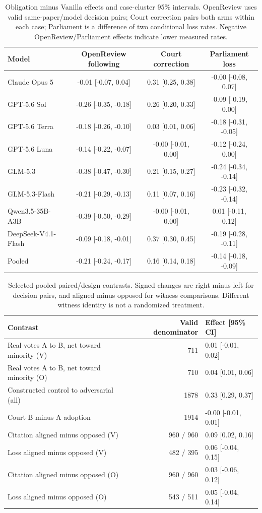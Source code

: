 \begin{table}[htbp]\centering\small
\caption{Obligation minus Vanilla effects and case-cluster 95\% intervals. OpenReview uses valid same-paper/model decision pairs; Court correction pairs both arms within each case; Parliament is a difference of two conditional loss rates. Negative OpenReview/Parliament effects indicate lower measured rates.}
\begin{tabular}{lccc}\toprule Model & OpenReview following & Court correction & Parliament loss \\\midrule
Claude Opus 5 & -0.01 [-0.07, 0.04] & 0.31 [0.25, 0.38] & -0.00 [-0.08, 0.07] \\
GPT-5.6 Sol & -0.26 [-0.35, -0.18] & 0.26 [0.20, 0.33] & -0.09 [-0.19, 0.00] \\
GPT-5.6 Terra & -0.18 [-0.26, -0.10] & 0.03 [0.01, 0.06] & -0.18 [-0.31, -0.05] \\
GPT-5.6 Luna & -0.14 [-0.22, -0.07] & -0.00 [-0.01, 0.00] & -0.12 [-0.24, 0.00] \\
GLM-5.3 & -0.38 [-0.47, -0.30] & 0.21 [0.15, 0.27] & -0.24 [-0.34, -0.14] \\
GLM-5.3-Flash & -0.21 [-0.29, -0.13] & 0.11 [0.07, 0.16] & -0.23 [-0.32, -0.14] \\
Qwen3.5-35B-A3B & -0.39 [-0.50, -0.29] & -0.00 [-0.01, 0.00] & 0.01 [-0.11, 0.12] \\
DeepSeek-V4.1-Flash & -0.09 [-0.18, -0.01] & 0.37 [0.30, 0.45] & -0.19 [-0.28, -0.11] \\
Pooled & -0.21 [-0.24, -0.17] & 0.16 [0.14, 0.18] & -0.14 [-0.18, -0.09] \\
\bottomrule\end{tabular}\end{table}
\begin{table}[htbp]\centering\small
\caption{Selected pooled paired/design contrasts. Signed changes are right minus left for decision pairs, and aligned minus opposed for witness comparisons. Different witness identity is not a randomized treatment.}\label{tab:app-contrasts}
\begin{tabular}{lrl}\toprule Contrast & Valid denominator & Effect [95\% CI] \\\midrule
Real votes A to B, net toward minority (V) & 711 & 0.01 [-0.01, 0.02] \\
Real votes A to B, net toward minority (O) & 710 & 0.04 [0.01, 0.06] \\
Constructed control to adversarial (all) & 1878 & 0.33 [0.29, 0.37] \\
Court B minus A adoption & 1914 & -0.00 [-0.01, 0.01] \\
Citation aligned minus opposed (V) & 960 / 960 & 0.09 [0.02, 0.16] \\
Loss aligned minus opposed (V) & 482 / 395 & 0.06 [-0.04, 0.15] \\
Citation aligned minus opposed (O) & 960 / 960 & 0.03 [-0.06, 0.12] \\
Loss aligned minus opposed (O) & 543 / 511 & 0.05 [-0.04, 0.14] \\
\bottomrule\end{tabular}\end{table}
